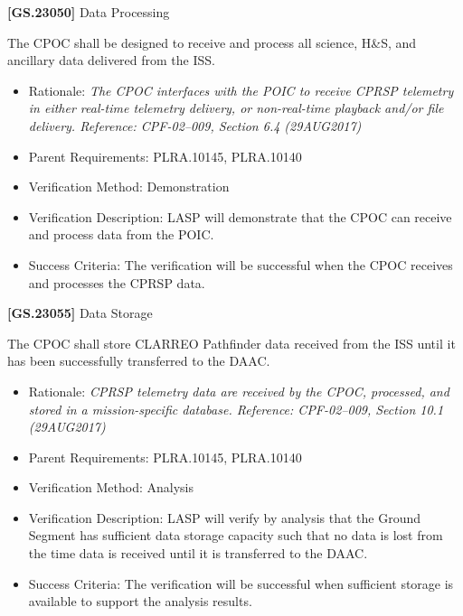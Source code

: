 \documentclass[12pt,oneside,oldfontcommands]{memoir}
\begin{document}
\textbf{[GS.23050]} Data Processing

The \gls{CPOC} shall be designed to receive and process all science, H\&S, and ancillary data delivered from the \gls{ISS}.

\begin{itemize}
\item{} Rationale: \emph{The CPOC interfaces with the POIC to receive CPRSP telemetry in either real-time telemetry delivery, or non-real-time playback and\slash or file delivery. Reference: CPF-02--009, Section 6.4 (29AUG2017)}

\item{} Parent Requirements: PLRA.10145, PLRA.10140

\item{} Verification Method: Demonstration

\item{} Verification Description: \gls{LASP} will demonstrate that the \gls{CPOC} can receive and process data from the \gls{POIC}.

\item{} Success Criteria: The verification will be successful when the \gls{CPOC} receives and processes the \gls{CPRSP} data.

\end{itemize}

\textbf{[GS.23055]} Data Storage

The \gls{CPOC} shall store \gls{CLARREO} Pathfinder data received from the \gls{ISS} until it has been successfully transferred to the \gls{DAAC}.

\begin{itemize}
\item{} Rationale: \emph{CPRSP telemetry data are received by the CPOC, processed, and stored in a mission-specific database. Reference: CPF-02--009, Section 10.1 (29AUG2017)}

\item{} Parent Requirements: PLRA.10145, PLRA.10140

\item{} Verification Method: Analysis

\item{} Verification Description: \gls{LASP} will verify by \gls{analysis} that the Ground Segment has sufficient data storage capacity such that no data is lost from the time data is received until it is transferred to the \gls{DAAC}.

\item{} Success Criteria: The verification will be successful when sufficient storage is available to support the \gls{analysis} results.

\end{itemize}
\end{document}
